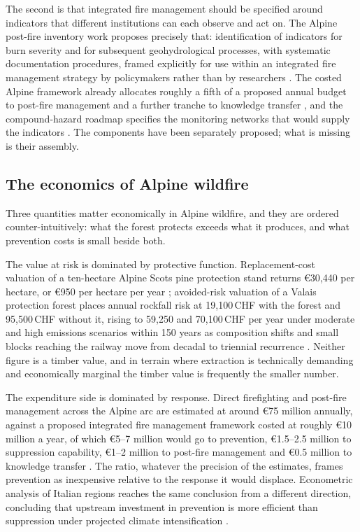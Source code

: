 \documentclass[11pt,a4paper]{article}
\begin{document}
The second is that integrated fire management should be specified around indicators that different institutions can each observe and act on. The Alpine post-fire inventory work proposes precisely that: identification of indicators for burn severity and for subsequent geohydrological processes, with systematic documentation procedures, framed explicitly for use within an integrated fire management strategy by policymakers rather than by researchers \citep{melzner_wildfire-induced_2025}. The costed Alpine framework already allocates roughly a fifth of a proposed annual budget to post-fire management and a further tranche to knowledge transfer \citep{muller_forest_2020}, and the compound-hazard roadmap specifies the monitoring networks that would supply the indicators \citep{baselt_compound_2026}. The components have been separately proposed; what is missing is their assembly.

\subsection{The economics of Alpine wildfire}
\label{sec:economics}

Three quantities matter economically in Alpine wildfire, and they are ordered counter-intuitively: what the forest protects exceeds what it produces, and what prevention costs is small beside both.

The value at risk is dominated by protective function. Replacement-cost valuation of a ten-hectare Alpine Scots pine protection stand returns €30{,}440 per hectare, or €950 per hectare per year \citep{accastello_asforesee_2019}; avoided-risk valuation of a Valais protection forest places annual rockfall risk at 19{,}100\,CHF with the forest and 95{,}500\,CHF without it, rising to 59{,}250 and 70{,}100\,CHF per year under moderate and high emissions scenarios within 150 years as composition shifts and small blocks reaching the railway move from decadal to triennial recurrence \citep{moos_climate_2021}. Neither figure is a timber value, and in terrain where extraction is technically demanding and economically marginal \citep{dinca_timber_2025} the timber value is frequently the smaller number.

The expenditure side is dominated by response. Direct firefighting and post-fire management across the Alpine arc are estimated at around €75 million annually, against a proposed integrated fire management framework costed at roughly €10 million a year, of which €5--7 million would go to prevention, €1.5--2.5 million to suppression capability, €1--2 million to post-fire management and €0.5 million to knowledge transfer \citep{muller_forest_2020}. The ratio, whatever the precision of the estimates, frames prevention as inexpensive relative to the response it would displace. Econometric analysis of Italian regions reaches the same conclusion from a different direction, concluding that upstream investment in prevention is more efficient than suppression under projected climate intensification \citep{michetti_forest_2019}.
\end{document}

